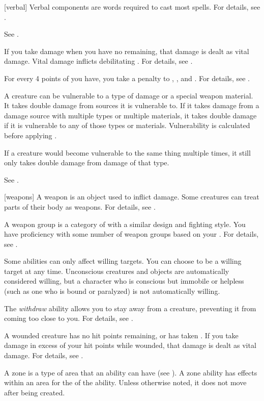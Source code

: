 [verbal] Verbal components are words required to cast most spells.
For details, see .

 See .

 If you take damage when you have no  remaining, that damage is dealt as vital damage.
Vital damage inflicts debilitating .
For details, see .

 For every 4 points of  you have, you take a  penalty to , , and .
For details, see .

 A creature can be vulnerable to a type of damage or a special weapon material.
It takes double damage from sources it is vulnerable to.
If it takes damage from a damage source with multiple types or multiple materials, it takes double damage if it is vulnerable to any of those types or materials.
Vulnerability is calculated before applying .
\par If a creature would become vulnerable to the same thing multiple times, it still only takes double damage from damage of that type.

 See .

[weapons] A weapon is an object used to inflict damage.
Some creatures can treat parts of their body as weapons.
For details, see .

 A weapon group is a category of  with a similar design and fighting style.
You have proficiency with some number of weapon groups based on your .
For details, see .

 Some abilities can only affect willing targets. You can choose to be a willing target at any time. Unconscious creatures and objects are automatically considered willing, but a character who is conscious but immobile or helpless (such as one who is bound or paralyzed) is not automatically willing.

 The \textit{withdraw} ability allows you to stay away from a creature, preventing it from coming too close to you.
For details, see .

 A wounded creature has no hit points remaining, or has taken .
If you take damage in excess of your hit points while wounded, that damage is dealt as vital damage.
For details, see .

 A zone is a type of area that an ability can have (see ).
A zone ability has effects within an area for the  of the ability.
Unless otherwise noted, it does not move after being created.
